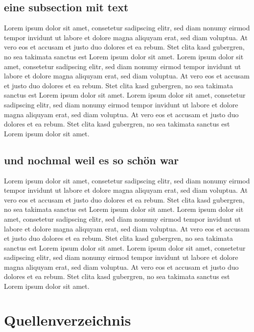 \documentclass[12pt, oneside]{article}  		%
\begin{document}
\begin{spacing}{1.5}
\subsection{eine subsection mit text}
Lorem ipsum dolor sit amet, consetetur sadipscing elitr, sed diam nonumy eirmod tempor invidunt ut labore et dolore magna aliquyam erat, sed diam voluptua. At vero eos et accusam et justo duo dolores et ea rebum. Stet clita kasd gubergren, no sea takimata sanctus est Lorem ipsum dolor sit amet. Lorem ipsum dolor sit amet, consetetur sadipscing elitr, sed diam nonumy eirmod tempor invidunt ut labore et dolore magna aliquyam erat, sed diam voluptua. At vero eos et accusam et justo duo dolores et ea rebum. Stet clita kasd gubergren, no sea takimata sanctus est Lorem ipsum dolor sit amet. Lorem ipsum dolor sit amet, consetetur sadipscing elitr, sed diam nonumy eirmod tempor invidunt ut labore et dolore magna aliquyam erat, sed diam voluptua. At vero eos et accusam et justo duo dolores et ea rebum. Stet clita kasd gubergren, no sea takimata sanctus est Lorem ipsum dolor sit amet.

\subsection{und nochmal weil es so schön war}
Lorem ipsum dolor sit amet, consetetur sadipscing elitr, sed diam nonumy eirmod tempor invidunt ut labore et dolore magna aliquyam erat, sed diam voluptua. At vero eos et accusam et justo duo dolores et ea rebum. Stet clita kasd gubergren, no sea takimata sanctus est Lorem ipsum dolor sit amet. Lorem ipsum dolor sit amet, consetetur sadipscing elitr, sed diam nonumy eirmod tempor invidunt ut labore et dolore magna aliquyam erat, sed diam voluptua. At vero eos et accusam et justo duo dolores et ea rebum. Stet clita kasd gubergren, no sea takimata sanctus est Lorem ipsum dolor sit amet. Lorem ipsum dolor sit amet, consetetur sadipscing elitr, sed diam nonumy eirmod tempor invidunt ut labore et dolore magna aliquyam erat, sed diam voluptua. At vero eos et accusam et justo duo dolores et ea rebum. Stet clita kasd gubergren, no sea takimata sanctus est Lorem ipsum dolor sit amet.

\newpage
\section{Quellenverzeichnis}

\printbibliography


\newpage

\end{spacing}
\end{document}
